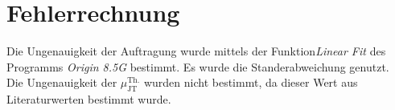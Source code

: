 \documentclass[a4paper,12pt,oneside,onecolum,final,openany]{report}
\begin{document}
\section{Fehlerrechnung}
Die Ungenauigkeit der Auftragung wurde mittels der Funktion\textit{Linear Fit} des Programms \textit{Origin 8.5G} bestimmt. Es wurde die Standerabweichung genutzt. \\
Die Ungenauigkeit der $\mu_{\text{JT}}^{\text{Th.}}$ wurden nicht bestimmt, da dieser Wert aus Literaturwerten bestimmt wurde.
\end{document}
